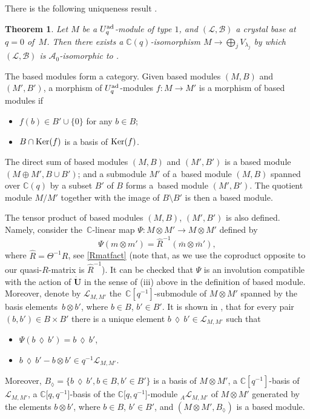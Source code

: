 \documentclass[10pt,a4paper]{amsart}
\numberwithin{equation}{section}
\newtheorem{teo}{Theorem}[section]
\theoremstyle{definition}
\newcommand{\mc}{\mathbb{C}}
\newcommand{\Ll}{{\mathcal L}}
\newcommand{\ra}{\rightarrow}
\begin{document}
There is the following uniqueness result \cite[Theorem 3]{Kashiwara1}.

\begin{teo}\label{Kashiuniqueteo} Let $M$ be a $U_q^{\rm ad}$-module of type $1$, and $(\Ll, \mathcal{B})$ a crystal base at $q=0$ of~$M$. Then there exists a $\mc(q)$-isomorphism $M\ra \bigoplus_j V_{\lambda_j}$ by which $(\Ll, \mathcal{B})$ is $\mathcal{A}_0$-isomorphic to \smash{$ \bigoplus_j \big(\Ll_{\lambda_j}^{\rm low}, \mathcal{B}_{\lambda_j}^{\rm low}\big)$}.
\end{teo}

The based modules form a category. Given based modules $(M,B)$ and $(M',B')$, a morphism of $U_q^{\rm ad}$-modules $f\colon M\ra M'$ is a morphism of based modules if{\samepage
\begin{itemize}\itemsep=0pt
\item[(a)] $f(b)\in B'\cup\{0\}$ for any $b\in B$;
\item[(b)] $B\cap {\rm Ker}(f)$ is a basis of ${\rm Ker}(f)$.
\end{itemize}}%

\pagebreak

\noindent
The direct sum of based modules $(M,B)$ and $(M',B')$ is a based module $(M \oplus M',B\cup B')$; and a submodule $M'$ of a~based module $(M,B)$ spanned over $\mc(q)$ by a subset $B'$ of $B$ forms a~based module $(M',B')$. The quotient module $M/M'$ together with the image of $B\setminus B'$ is then a based module.

The tensor product of based modules $(M,B)$, $(M',B')$ is also defined. Namely, consider the~$\mc$-linear map $\Psi\colon M\otimes M' \ra M\otimes M'$ defined by
\[
\Psi(m\otimes m') = \hat{R}^{-1}(\bar{m}\otimes \bar{m}'),
\] where $\hat{R} = \Theta^{-1}R$, see \eqref{Rmatfact} (note that, as we use the coproduct opposite to \cite{Lusztig} our quasi-$R$-matrix is $\hat{R}^{-1}$). It can be checked that $\Psi$ is an involution compatible with the action of $\dot{\mathbf{U}}$ in the sense of (iii) above in the definition of based module. Moreover, denote by $\Ll_{M,M'}$ the~$\mc[q^{-1}]$-submodule of $M\otimes M'$ spanned by the basis elements~$b\otimes b'$, where $b\in B$, $b'\in B'$. It is shown in \cite[Section~27.3]{Lusztig}, that for every pair $(b,b')\in B\times B'$ there is a unique element $b\,\lozenge\, b'\in \Ll_{M,M'}$ such that
\begin{itemize}\itemsep=0pt
\item[(a)] $\Psi(b\,\lozenge\, b')=b\,\lozenge\, b'$,
\item[(b)] $b\,\lozenge\, b' - b\otimes b'\in q^{-1} \mathcal{\Ll}_{M,M'}$.
\end{itemize}
Moreover, $B_{\lozenge} = \{b\,\lozenge\, b', b\in B, b'\in B'\}$ is a basis of $M\otimes M'$, a $\mc[q^{-1}]$-basis of $\Ll_{M,M'}$, a $\mc\big[q,q^{-1}\big]$-basis of the $\mc\big[q,q^{-1}\big]$-module ${}_A\Ll_{M,M'}$ of $M\otimes M'$ generated by the elements $b\otimes b'$, where $b\in B$, $b'\in B'$, and $(M\otimes M',B_{\lozenge})$ is a based module.
\end{document}
